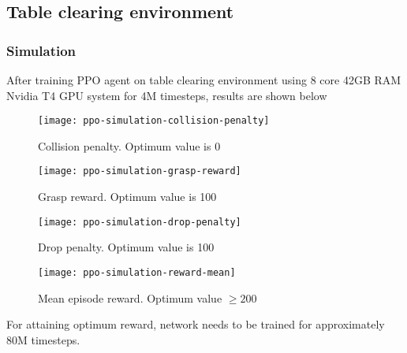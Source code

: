 \subsection{Table clearing environment}
\subsubsection{Simulation}
After training PPO agent on table clearing environment using 8 core 42GB RAM Nvidia T4 GPU system for 4M timesteps, results are shown below

\begin{figure}[H]
	\centering
	\texttt{[image: ppo-simulation-collision-penalty]}
	\caption{Collision penalty. Optimum value is 0}
\end{figure}

\begin{figure}[H]
	\centering
	\texttt{[image: ppo-simulation-grasp-reward]}
	\caption{Grasp reward. Optimum value is 100}
\end{figure}

\begin{figure}[H]
	\centering
	\texttt{[image: ppo-simulation-drop-penalty]}
	\caption{Drop penalty. Optimum value is 100}
\end{figure}

\begin{figure}[H]
	\centering
	\texttt{[image: ppo-simulation-reward-mean]}
	\caption{Mean episode reward. Optimum value $\ge 200$}
\end{figure}

For attaining optimum reward, network needs to be trained for approximately 80M timesteps.